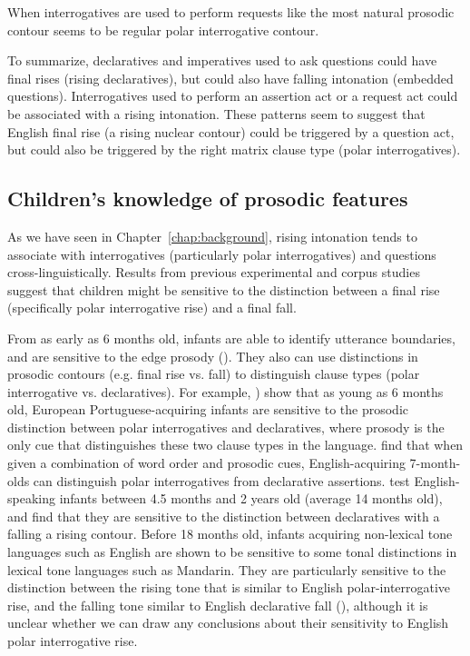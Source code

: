 When interrogatives are used to perform requests like  the most natural prosodic contour seems to be regular polar interrogative contour. 

To summarize, declaratives and imperatives used to ask questions could have final rises (rising declaratives), but could also have falling intonation (embedded questions). Interrogatives used to perform an assertion act or a request act could be associated with a rising intonation. These patterns seem to suggest that English final rise (a rising nuclear contour) could be triggered by a question act, but could also be triggered by the right matrix clause type (polar interrogatives).  





\subsection{Children's knowledge of prosodic features}
\label{sec:prosody:children}
As we have seen in Chapter~\ref{chap:background}, rising intonation tends to associate with interrogatives (particularly polar interrogatives) and questions cross-linguistically. Results from previous experimental and corpus studies suggest that children might be sensitive to the distinction between a final rise (specifically polar interrogative rise) and a final fall. 

From as early as 6 months old, infants are able to identify utterance boundaries, and are sensitive to the edge prosody (\cite{johnson2014edge}). They also can use distinctions in prosodic contours (e.g. final rise vs. fall) to distinguish clause types (polar interrogative vs. declaratives). For example, \textcite{frota2014}) show that as young as 6 months old, European Portuguese-acquiring infants are sensitive to the prosodic distinction between polar interrogatives and declaratives, where prosody is the only cue that distinguishes these two clause types in the language. \textcite{geffenmintz2011} find that when given a combination of word order and prosodic cues, English-acquiring 7-month-olds can distinguish polar interrogatives from declarative assertions. \textcite{soderstrom2005clause} test English-speaking infants between 4.5 months and 2 years old (average 14 months old), and find that they are sensitive to the distinction between declaratives with a falling a rising contour. Before 18 months old, infants acquiring non-lexical tone languages such as English are shown to be sensitive to some tonal distinctions in lexical tone languages such as Mandarin. They are particularly sensitive to the distinction between the rising tone that is similar to English polar-interrogative rise, and the falling tone similar to English declarative fall (\cite{shi2017tone, Hay2019}), although it is unclear whether we can draw any conclusions about their sensitivity to English polar interrogative rise.

